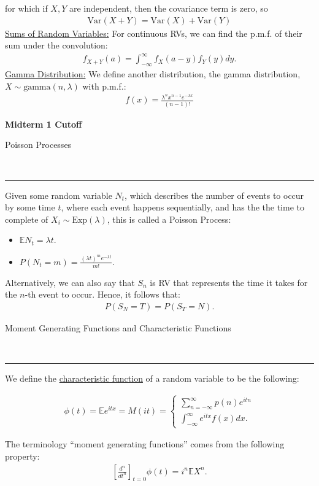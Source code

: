 \documentclass{article}
\newcommand{\header}[1]{\begin{large}\noindent #1\end{large}\\\rule{\textwidth}{0.5pt}}
\newcommand{\sheader}[1]{\underline{#1:}}
\begin{document}
for which if $X, Y$ are independent, then the covariance term is zero, so
\begin{align*}
    \textrm{Var}(X + Y) = \textrm{Var}(X) + \textrm{Var}(Y)
\end{align*}
\sheader{Sums of Random Variables} For continuous RVs, we can find the
p.m.f. of their sum under the convolution:
\begin{align*}
    f_{X + Y}(a) = \int_{-\infty}^{\infty} f_X(a-y)f_Y(y)dy.
\end{align*}
\sheader{Gamma Distribution} We define another distribution, the gamma distribution, $X \sim \textrm{gamma}(n, \lambda)$ with 
p.m.f.:
\begin{align*}
    f(x) = \frac{\lambda^n x^{n - 1} e^{-\lambda x}}{(n - 1)!}
\end{align*}

\textbf{Midterm 1 Cutoff}

\pagebreak

\header{Poisson Processes}

Given some random variable $N_t$, which describes the number of 
events to occur by some time $t$, where each event happens sequentially,
and has the the time to complete of $X_i \sim \textrm{Exp}(\lambda)$,
this is called a Poisson Process:
\begin{itemize}
    \item $\mathbb{E}N_t = \lambda t$.
    \item $P(N_t = m) = \frac{(\lambda t)^m e^{-\lambda t}}{m!}$.
\end{itemize}
Alternatively, we can also say that $S_n$ is RV that represents the time 
it takes for the $n$-th event to occur. Hence, it follows that:
\begin{align*}
    P(S_N = T) = P(S_T = N).
\end{align*}

\header{Moment Generating Functions and Characteristic Functions}

We define the \underline{characteristic function} of a random variable 
to be the following:

\begin{align*}
    \phi(t) = \mathbb{E}e^{itx} = M(it) = \begin{cases}
        \sum_{n = - \infty}^\infty p(n)e^{itn}\\
        \int_{-\infty}^{\infty}e^{itx}f(x)dx.
    \end{cases}
\end{align*}

The terminology ``moment generating functions'' comes from the following 
property:
\begin{align*}
    \left[\frac{d^n}{dt^n}\right]_{t=0} \phi(t) = i^n \mathbb{E}X^n.
\end{align*}
\end{document}
